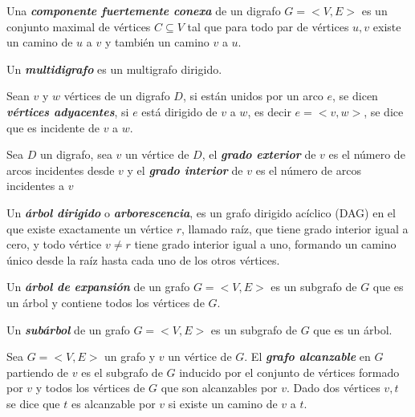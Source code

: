 \begin{definition}
    Una \textbf{\textit{componente fuertemente conexa}} de un digrafo $G=<V,E>$ es un conjunto maximal 
    de v\'ertices $C \subseteq V$ tal que para todo par de v\'ertices $u,v$ existe un camino de $u$ 
    a $v$ y tambi\'en un camino $v$ a $u$. 

\end{definition}

\begin{definition}
    Un \textbf{\textit{multidigrafo}} es un multigrafo dirigido.
\end{definition}

\begin{definition}
    Sean $v$ y $w$ v\'ertices de un digrafo $D$, si est\'an unidos por un arco $e$, se dicen 
    \textbf{\textit{v\'ertices adyacentes}}, si $e$ est\'a dirigido de $v$ a $w$, es decir $e=<v,w>$, 
    se dice que es incidente de $v$ a $w$.
\end{definition}

\begin{definition}
    Sea $D$ un digrafo, sea $v$ un v\'ertice de $D$, el \textbf{\textit{grado exterior}} de $v$ es el 
    n\'umero de arcos incidentes desde $v$ y el \textbf{\textit{grado interior}} de $v$ es el n\'umero 
    de arcos incidentes a $v$
\end{definition}

\begin{definition}
    Un \textbf{\textit{\'arbol dirigido}} o \textbf{\textit{arborescencia}}, es un 
    grafo dirigido acíclico (DAG) en el que existe exactamente un vértice $r$, llamado raíz, que tiene grado interior 
    igual a cero, y todo v\'ertice $v \neq r$ tiene grado interior igual a uno, formando un camino 
    único desde la raíz hasta cada uno de los otros vértices.
\end{definition}

\begin{definition}
    Un \textbf{\textit{\'arbol de expansión}} de un grafo $G=<V,E>$ es un subgrafo de $G$ que es un \'arbol 
    y contiene todos los v\'ertices de $G$.
\end{definition}

\begin{definition}
    Un \textbf{\textit{sub\'arbol}} de un grafo $G=<V,E>$ es un subgrafo de $G$ que es un \'arbol.
\end{definition}

\begin{definition}
    Sea $G=<V,E>$ un grafo y $v$ un v\'ertice de $G$. El \textbf{\textit{grafo alcanzable}} en $G$ partiendo de $v$ 
    es el subgrafo de $G$ inducido por el conjunto de v\'ertices formado por $v$ y todos los v\'ertices de $G$ que 
    son alcanzables por $v$. Dado dos v\'ertices $v,t$ se dice que $t$ es alcanzable por $v$ si existe un 
    camino de $v$ a $t$.  
\end{definition}